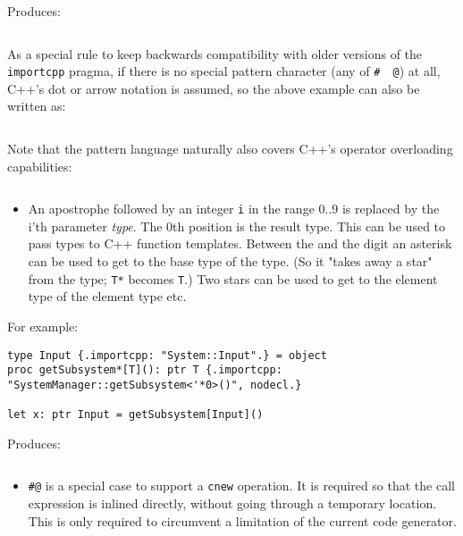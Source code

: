 Produces:

\begin{verbatim}
\end{verbatim}

As a special rule to keep backwards compatibility with older versions of
the \texttt{importcpp} pragma, if there is no special pattern character
(any of \texttt{\#\ \textquotesingle{}\ @}) at all, C++'s dot or arrow
notation is assumed, so the above example can also be written as:

\begin{verbatim}
\end{verbatim}

Note that the pattern language naturally also covers C++'s operator
overloading capabilities:

\begin{verbatim}
\end{verbatim}

\begin{itemize}
\tightlist
\item
  An apostrophe \texttt{\textquotesingle{}} followed by an integer
  \texttt{i} in the range 0..9 is replaced by the i'th parameter
  \emph{type}. The 0th position is the result type. This can be used to
  pass types to C++ function templates. Between the
  \texttt{\textquotesingle{}} and the digit an asterisk can be used to
  get to the base type of the type. (So it "takes away a star" from the
  type; \texttt{T*} becomes \texttt{T}.) Two stars can be used to get to
  the element type of the element type etc.
\end{itemize}

For example:

\begin{verbatim}
type Input {.importcpp: "System::Input".} = object
proc getSubsystem*[T](): ptr T {.importcpp: "SystemManager::getSubsystem<'*0>()", nodecl.}

let x: ptr Input = getSubsystem[Input]()
\end{verbatim}

Produces:

\begin{verbatim}
\end{verbatim}

\begin{itemize}
\tightlist
\item
  \texttt{\#@} is a special case to support a \texttt{cnew} operation.
  It is required so that the call expression is inlined directly,
  without going through a temporary location. This is only required to
  circumvent a limitation of the current code generator.
\end{itemize}

